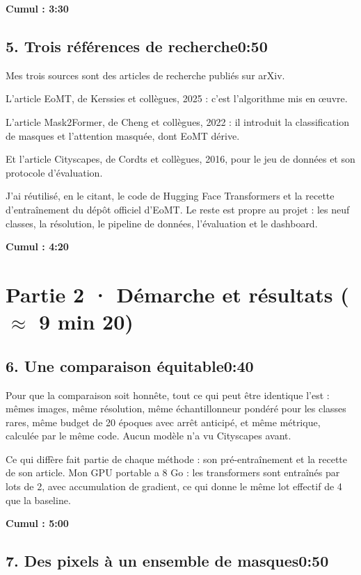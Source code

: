 \documentclass[11pt,a4paper]{article}
\newcommand{\cumul}[1]{\par{\hfill\small\color{accent}\bfseries #1}\par}
\newcommand{\tempo}[1]{\hfill{\normalsize\color{accent}#1}}
\begin{document}
\cumul{Cumul : 3:30}

\subsection*{5. Trois références de recherche\tempo{0:50}}

Mes trois sources sont des articles de recherche publiés sur arXiv.

L'article EoMT, de Kerssies et collègues, 2025 : c'est l'algorithme mis en œuvre.

L'article Mask2Former, de Cheng et collègues, 2022 : il introduit la classification de masques et l'attention masquée, dont EoMT dérive.

Et l'article Cityscapes, de Cordts et collègues, 2016, pour le jeu de données et son protocole d'évaluation.

J'ai réutilisé, en le citant, le code de Hugging Face Transformers et la recette d'entraînement du dépôt officiel d'EoMT. Le reste est propre au projet : les neuf classes, la résolution, le pipeline de données, l'évaluation et le dashboard.

\cumul{Cumul : 4:20}

\medskip{\color{linec}\rule{\linewidth}{0.5pt}}\medskip

\section*{Partie 2 · Démarche et résultats ($\approx$ 9 min 20)}

\subsection*{6. Une comparaison équitable\tempo{0:40}}

Pour que la comparaison soit honnête, tout ce qui peut être identique l'est : mêmes images, même résolution, même échantillonneur pondéré pour les classes rares, même budget de 20 époques avec arrêt anticipé, et même métrique, calculée par le même code. Aucun modèle n'a vu Cityscapes avant.

Ce qui diffère fait partie de chaque méthode : son pré-entraînement et la recette de son article. Mon GPU portable a 8 Go : les transformers sont entraînés par lots de 2, avec accumulation de gradient, ce qui donne le même lot effectif de 4 que la baseline.

\cumul{Cumul : 5:00}

\subsection*{7. Des pixels à un ensemble de masques\tempo{0:50}}
\end{document}
